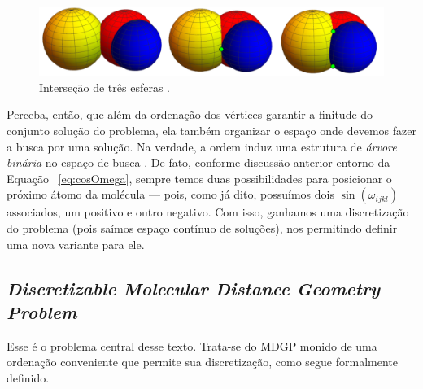 \documentclass[a4paper,12pt]{article}
\begin{document}
 	\begin{figure}[H]
 		\begin{center}
 			\includegraphics[width=0.8\linewidth]{esferas.png}
 		\end{center}
 		\caption{Interseção de três esferas \cite{carlileBook31Coloquio}.}
 		\label{fig:esferas}
 	\end{figure}
 	
 	Perceba, então, que além da ordenação dos vértices garantir a finitude do conjunto solução do problema, ela também organizar o espaço onde devemos fazer a busca por uma solução. Na verdade, a ordem induz uma estrutura de \textit{árvore binária} no espaço de busca \cite{fidalgotese}. De fato, conforme discussão anterior entorno da Equação ~\ref{eq:cosOmega}, sempre temos duas possibilidades para posicionar o próximo átomo da molécula \cite{carlileGDandAplications} --- pois, como já dito, possuímos dois $\sin(\omega_{ijkl})$ associados, um positivo e outro negativo. Com isso, ganhamos uma discretização do problema (pois saímos espaço contínuo de soluções), nos permitindo definir uma nova variante para ele.
 	
 	\subsection{\textit{Discretizable Molecular Distance Geometry Problem}}
 	Esse é o problema central desse texto. Trata-se do MDGP monido de uma ordenação conveniente que permite sua discretização, como segue formalmente definido.
 	
\end{document}
